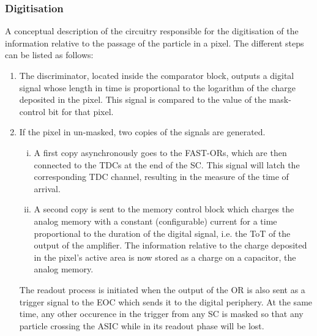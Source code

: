 			\subsubsection{Digitisation}
			A conceptual description of the circuitry responsible for the digitisation of the information relative to the passage of the particle in a pixel. The different steps can be listed as follows: 
			\begin{enumerate} [1.]
				\item The discriminator, located inside the comparator block, outputs a digital signal whose length in time is proportional to the logarithm of the charge deposited in the pixel. This signal is compared to the value of the mask-control bit for that pixel.
				\item If the pixel in un-masked, two copies of the signals are generated. 
				\begin{enumerate}[(i)]
					\item A first copy asynchronously goes to the FAST-ORs, which are then connected to the TDCs at the end of the SC. This signal will latch the corresponding TDC channel, resulting in the measure of the time of arrival. 
					\item A second copy is sent to the memory control block which charges the analog memory with a constant (configurable) current for a time proportional to the duration of the digital signal, i.e. the ToT of the output of the amplifier. The information relative to the charge deposited in the pixel's active area is now stored as a charge on a capacitor, the analog memory.   
				\end{enumerate}
				
				The readout process is initiated when the output of the OR is also sent as a trigger signal to the EOC which sends it to the digital periphery. At the same time, any other occurence in the trigger from any SC is masked so that any particle crossing the ASIC while in its readout phase will be lost. 
			

\end{enumerate}
